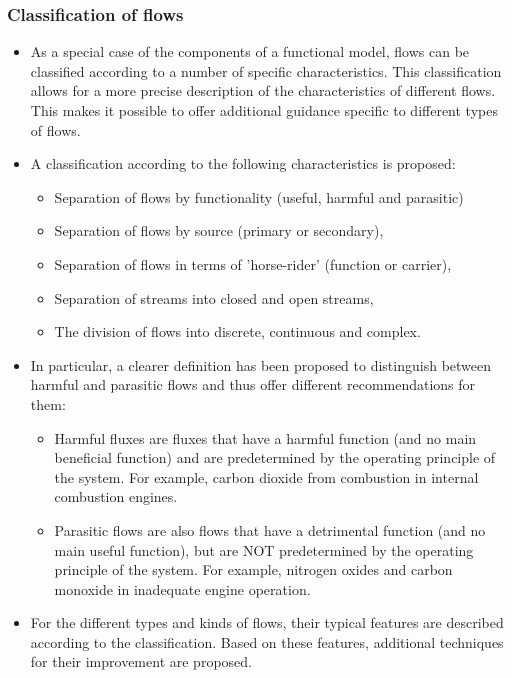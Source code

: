 \documentclass[a4paper,11pt]{article}
\begin{document}
\subsubsection{Classification of flows}
\begin{itemize}
\item As a special case of the components of a functional model, flows can be
  classified according to a number of specific characteristics. This
  classification allows for a more precise description of the characteristics
  of different flows. This makes it possible to offer additional guidance
  specific to different types of flows.
\item A classification according to the following characteristics is proposed:
  \begin{itemize}
  \item Separation of flows by functionality (useful, harmful and parasitic)
  \item Separation of flows by source (primary or secondary),
  \item Separation of flows in terms of 'horse-rider' (function or carrier),
  \item Separation of streams into closed and open streams,
  \item The division of flows into discrete, continuous and complex.
  \end{itemize}
\item In particular, a clearer definition has been proposed to distinguish
  between harmful and parasitic flows and thus offer different recommendations
  for them:
  \begin{itemize}
  \item Harmful fluxes are fluxes that have a harmful function (and no main
    beneficial function) and are predetermined by the operating principle of
    the system. For example, carbon dioxide from combustion in internal
    combustion engines.
  \item Parasitic flows are also flows that have a detrimental function (and
    no main useful function), but are NOT predetermined by the operating
    principle of the system. For example, nitrogen oxides and carbon monoxide
    in inadequate engine operation.
  \end{itemize}
\item For the different types and kinds of flows, their typical features are
  described according to the classification. Based on these features,
  additional techniques for their improvement are proposed.
\end{itemize}
\end{document}
